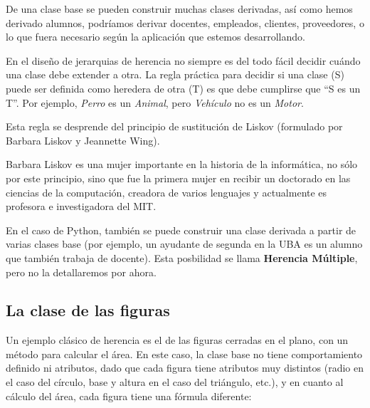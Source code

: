 De una clase base se pueden construir muchas clases derivadas, así como
hemos derivado alumnos, podríamos derivar docentes, empleados, clientes,
proveedores, o lo que fuera necesario según la aplicación que estemos
desarrollando.

\begin{sabias_que}
En el diseño de jerarquias de herencia no siempre es del todo fácil decidir
cuándo una clase debe extender a otra.
La regla práctica para decidir si una clase (S) puede ser
definida como heredera de otra (T) es que debe cumplirse que ``S es un T''.
Por ejemplo, {\it Perro} es un {\it Animal}, pero {\it Vehículo} no es un {\it
Motor}.

Esta regla se desprende del principio de sustitución de Liskov (formulado por
Barbara Liskov y Jeannette Wing).

Barbara Liskov es una mujer importante en la historia de la informática, no
sólo por este principio, sino que fue la primera mujer en recibir un doctorado
en las ciencias de la computación, creadora de varios lenguajes y actualmente
es profesora e investigadora del MIT.
\end{sabias_que}

En el caso de Python, también se puede construir una clase derivada a partir de
varias clases base (por ejemplo, un ayudante de segunda en la UBA es un alumno
que también trabaja de docente).  Esta posbilidad se llama {\bf Herencia
Múltiple}, pero no la detallaremos por ahora.

\subsection*{La clase de las figuras}

Un ejemplo clásico de herencia es el de las figuras cerradas en el plano, con un
método para calcular el área. En este caso, la clase base no tiene comportamiento definido
ni atributos, dado que cada figura tiene atributos muy distintos (radio en el caso
del círculo, base y altura en el caso del triángulo, etc.), y en cuanto al cálculo
del área, cada figura tiene una fórmula diferente:

